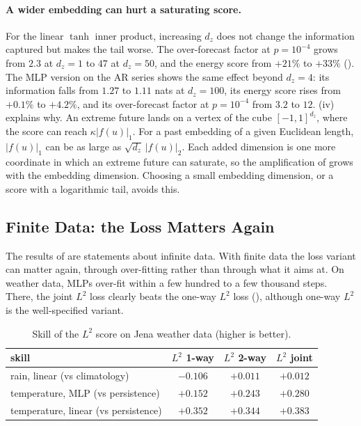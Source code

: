 \documentclass[11pt]{article}
\theoremstyle{plain}
\theoremstyle{definition}
\theoremstyle{remark}
\newcommand{\abs}[1]{\left\lvert #1 \right\rvert}
\begin{document}
\paragraph{A wider embedding can hurt a saturating score.} For the linear
$\tanh$ inner product, increasing $d_z$ does not change the information
captured but makes the tail worse. The over-forecast factor at $p=10^{-4}$
grows from $2.3$ at $d_z=1$ to $47$ at $d_z=50$, and the energy score from
$+21\%$ to $+33\%$ (). The MLP version on the AR series
shows the same effect beyond $d_z=4$: its information falls from $1.27$ to
$1.11$ nats at $d_z=100$, its energy score rises from $+0.1\%$ to $+4.2\%$,
and its over-forecast factor at $p=10^{-4}$ from $3.2$ to $12$.
(iv) explains why. An extreme future lands on a vertex of
the cube $[-1,1]^{d_z}$, where the score can reach $\kappa\abs{f(u)}_{1}$.
For a past embedding of a given Euclidean length, $\abs{f(u)}_{1}$ can be as
large as $\sqrt{d_z}\,\abs{f(u)}_{2}$. Each added dimension is one more
coordinate in which an extreme future can saturate, so the amplification of
 grows with the embedding dimension. Choosing a small
embedding dimension, or a score with a logarithmic tail, avoids this.

\subsection{Finite Data: the Loss Matters Again}
\label{ssec:finite}

The results of  are statements about infinite data.
With finite data the loss variant can matter again, through over-fitting
rather than through what it aims at. On weather data, MLPs over-fit within a
few hundred to a few thousand steps. There, the joint $L^2$ loss clearly beats
the one-way $L^2$ loss (), although one-way $L^2$ is the
well-specified variant.

\begin{table}[ht]
 \centering
 \begin{tabular}{lccc}
  \toprule
  skill                                  & $L^2$ 1-way & $L^2$ 2-way & $L^2$ joint \\
  \midrule
  rain, linear (vs climatology)          & $-0.106$    & $+0.011$    & $+0.012$    \\
  temperature, MLP (vs persistence)      & $+0.152$    & $+0.243$    & $+0.280$    \\
  temperature, linear (vs persistence)   & $+0.352$    & $+0.344$    & $+0.383$    \\
  \bottomrule
 \end{tabular}
 \caption{Skill of the $L^2$ score on Jena weather data (higher is better).}
 \label{tab:weather}
\end{table}
\end{document}
